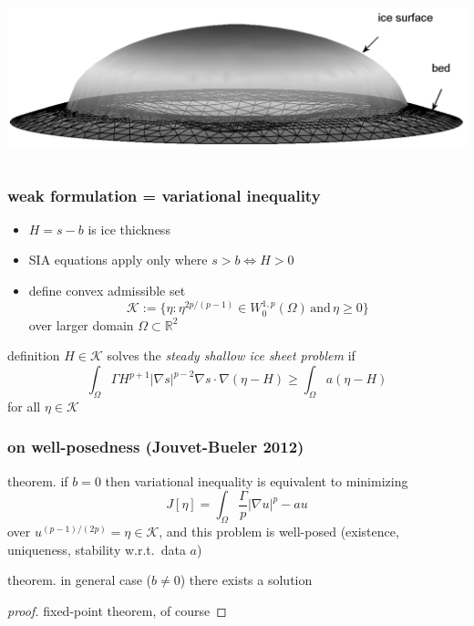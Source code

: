 \documentclass[hide notes,intlimits]{beamer}
\newcommand{\RR}{\mathbb{R}}
\newcommand{\Kcal}{\mathcal{K}}
\newcommand{\grad}{\nabla}
\begin{document}
\begin{frame}
\begin{columns}
\begin{column}{0.55\textwidth}
\begin{center}
\vspace{10mm}
\includegraphics[width=1.05\textwidth]{capnonflatobs}
\end{center}
\end{column}
\end{columns}
\end{frame}


\begin{frame}
  \frametitle{weak formulation = variational inequality} 

\begin{itemize}
\item $H=s-b$ is ice thickness
\item SIA equations apply only where $s>b \iff H > 0$
\item define convex admissible set
  $$\Kcal := \{\eta : \eta^{2p/(p-1)} \in W^{1,p}_0 (\Omega) \,\text{and}\, \eta \ge 0\}$$
over larger domain $\Omega \subset \RR^2$
\end{itemize}

\begin{block}{definition} 
$H \in \Kcal$ solves the \emph{steady shallow ice sheet problem} if
  $$\int_{\Omega}  \Gamma H^{p+1} |\grad s|^{p-2} \grad s \cdot \grad(\eta - H)  
\ge \int_{\Omega} a (\eta - H)$$
for all $\eta \in \Kcal$
\end{block}
\end{frame}


\begin{frame}
  \frametitle{on well-posedness (Jouvet-Bueler 2012)} 

\begin{block}{theorem.}
if $b=0$ then variational inequality is equivalent to minimizing
  $$J[\eta] = \int_{\Omega} \frac{\Gamma}{p} |\grad u|^p - a u$$
over $u^{(p-1)/(2p)} = \eta \in \Kcal$, and this problem is well-posed (existence, uniqueness, stability w.r.t.~data $a$)
\end{block}

\begin{block}{theorem.}
in general case ($b\ne 0$) there exists a solution
\end{block}

\begin{proof}[proof]
fixed-point theorem, of course
\end{proof}
\end{frame}
\end{document}
